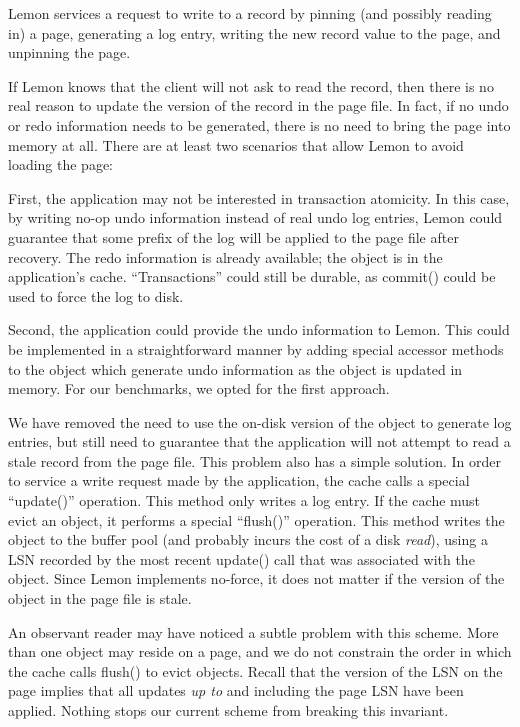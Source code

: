 \documentclass[letterpaper,twocolumn,english]{article}
\newcommand{\yad}{Lemon\xspace}
\begin{document}
\yad services a request to write to a record by pinning (and possibly
reading in) a page, generating a log entry, writing the
new record value to the page, and unpinning the page.

If \yad knows that the client will not ask to read the record, then
there is no real reason to update the version of the record in the
page file.  In fact, if no undo or redo information needs to be
generated, there is no need to bring the page into memory at all.
There are at least two scenarios that allow \yad to avoid loading the page:

First, the application may not be interested in transaction atomicity.
In this case, by writing no-op undo information instead of real undo
log entries, \yad could guarantee that some prefix of the log will be
applied to the page file after recovery.  The redo information is
already available; the object is in the application's cache.
``Transactions'' could still be durable, as commit() could be used to
force the log to disk.

Second, the application could provide the undo information to \yad.
This could be implemented in a straightforward manner by adding
special accessor methods to the object which generate undo information
as the object is updated in memory.  For our benchmarks, we opted for
the first approach.

We have removed the need to use the on-disk version of the object to
generate log entries, but still need to guarantee that the application
will not attempt to read a stale record from the page file.  This
problem also has a simple solution.  In order to service a write
request made by the application, the cache calls a special
``update()'' operation.  This method only writes a log entry.  If the
cache must evict an object, it performs a special ``flush()''
operation.  This method writes the object to the buffer pool (and
probably incurs the cost of a disk {\em read}), using a LSN recorded by the
most recent update() call that was associated with the object.  Since
\yad implements no-force, it does not matter if the
version of the object in the page file is stale.

An observant reader may have noticed a subtle problem with this
scheme.  More than one object may reside on a page, and we do not
constrain the order in which the cache calls flush() to evict objects.
Recall that the version of the LSN on the page implies that all
updates {\em up to} and including the page LSN have been applied.
Nothing stops our current scheme from breaking this invariant.  
\end{document}
